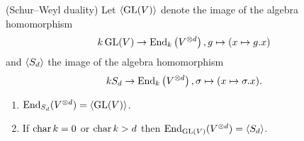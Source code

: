 \begin{thrm}(Schur--Weyl duality)
  Let $\left\langle \operatorname{GL}(V) \right\rangle$ denote the image of the algebra homomorphism
  \[
    k \operatorname{GL}(V) \to \operatorname{End}_k\left(V^{\otimes d}\right), g \mapsto (x \mapsto g.x)
  \]
  and $\left\langle S_d \right\rangle$ the image of the algebra homomorphism
  \[
    k S_d \to \operatorname{End}_k\left(V^{\otimes d}\right), \sigma \mapsto (x \mapsto \sigma.x).
  \]
  \begin{enumerate}[label=\emph{(\alph*)}, leftmargin=*]
    \item \label{enum: end sd = gl}
      $\operatorname{End}_{S_d}(V^{\otimes d}) = \left\langle \operatorname{GL}(V) \right\rangle$.
    \item \label{enum: end gl = sd}
      If $\operatorname{char} k = 0$ or $\operatorname{char} k > d$ then $\operatorname{End}_{\operatorname{GL}(V)}(V^{\otimes d}) = \left\langle S_d \right\rangle$.
  \end{enumerate}
\end{thrm}
